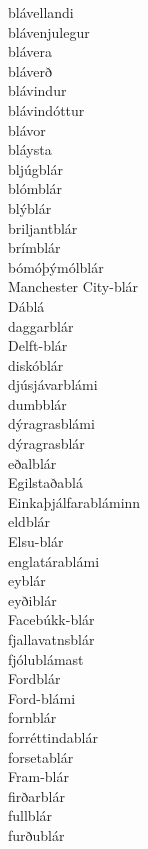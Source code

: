 \documentclass[../samsetningasafn.tex]{subfiles}
\begin{document}
\begin{bigwordlist}
\begin{footnotesize}
\begin{multicols}{4}
\begin{description}
		\item [blávellandi]
		\item [blávenjulegur]
		\item [blávera]
		\item [bláverð]
		\item [blávindur]
		\item [blávindóttur]
		\item [blávor]
		\item [bláysta]
		\item [bljúgblár]
		\item [blómblár]
		\item [blýblár]
		\item [briljantblár]
		\item [brímblár]
		\item [bómóþýmólblár]
		\item [Manchester City-blár]
		\item [Dáblá]
		\item [daggarblár]
		\item [Delft-blár]
		\item [diskóblár]
		\item [djúsjávarblámi]
		\item [dumbblár]
		\item [dýragrasblámi]
		\item [dýragrasblár]
		\item [eðalblár]
		\item [Egilstaðablá]
		\item [Einkaþjálfarabláminn]
		\item [eldblár]
		\item [Elsu-blár]
		\item [englatárablámi]
		\item [eyblár]
		\item [eyðiblár]
		\item [Facebúkk-blár]
		\item [fjallavatnsblár]
		\item [fjólublámast]
		\item [Fordblár]
		\item [Ford-blámi]
		\item [fornblár]
		\item [forréttindablár]
		\item [forsetablár]
		\item [Fram-blár]
		\item [firðarblár]
		\item [fullblár]
		\item [furðublár]

\end{description}
\end{multicols}
\end{footnotesize}
\end{bigwordlist}
\end{document}

